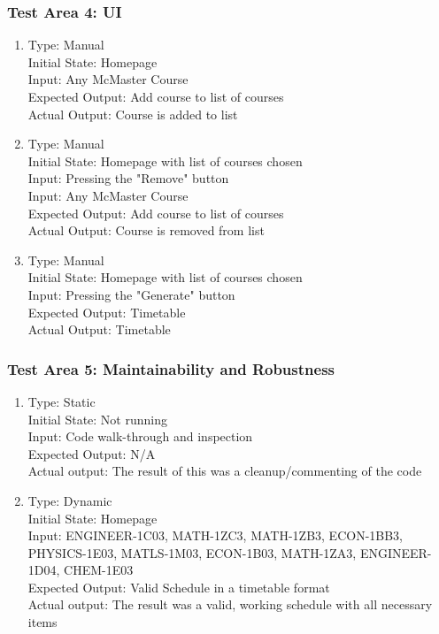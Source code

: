 \documentclass[11pt, oneside]{article}
\begin{document}
\subsubsection{Test Area 4: UI}
\begin{enumerate}

\item Type: Manual \\
Initial State: Homepage \\
Input: Any McMaster Course \\
Expected Output: Add course to list of courses \\
Actual Output: Course is added to list \\


\item Type: Manual \\
Initial State: Homepage with list of courses chosen\\
Input:  Pressing the "Remove" button \\
Input: Any McMaster Course \\
Expected Output: Add course to list of courses \\
Actual Output: Course is removed from list \\



\item Type: Manual \\
Initial State: Homepage with list of courses chosen\\
Input:  Pressing the "Generate" button \\
Expected Output: Timetable \\
Actual Output: Timetable \\

\end{enumerate}

\subsubsection{Test Area 5: Maintainability and Robustness}
\begin{enumerate}
\item Type: Static \\
Initial State: Not running \\
Input: Code walk-through and inspection\\
Expected Output: N/A \\
Actual output: The result of this was a cleanup/commenting of the code

\item Type: Dynamic \\
Initial State: Homepage \\
Input: ENGINEER-1C03, MATH-1ZC3, MATH-1ZB3,  ECON-1BB3, PHYSICS-1E03, MATLS-1M03, ECON-1B03, MATH-1ZA3, ENGINEER-1D04, CHEM-1E03\\
Expected Output: Valid Schedule in a timetable format \\
Actual output: The result was a valid, working schedule with all necessary items

\end{enumerate}
\end{document}
